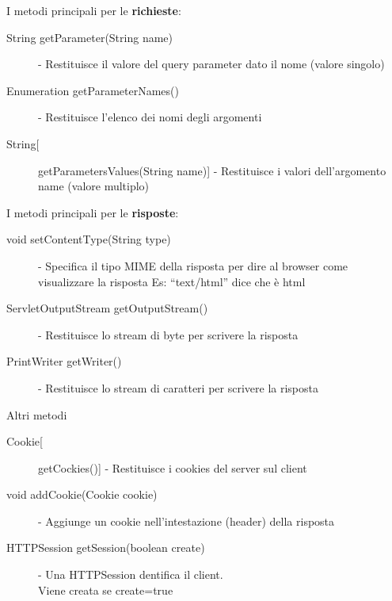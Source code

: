 I metodi principali per le \textbf{richieste}:
\begin{description}
    \item[String getParameter(String name)] - Restituisce il valore del query parameter dato il nome (valore singolo)
    \item[Enumeration getParameterNames()] - Restituisce l'elenco dei nomi degli argomenti
    \item[String[] getParametersValues(String name)] - Restituisce i valori dell'argomento name (valore multiplo)
\end{description}

I metodi principali per le \textbf{risposte}:
\begin{description}
    \item[void setContentType(String type)] - Specifica il tipo MIME della risposta per dire al browser come
    visualizzare la risposta Es: “text/html” dice che è html
    \item[ServletOutputStream getOutputStream()] - Restituisce lo stream di byte per scrivere la risposta
    \item[PrintWriter getWriter()] - Restituisce lo stream di caratteri per scrivere la risposta
\end{description}

Altri metodi
\begin{description}
    \item[Cookie[] getCockies()] - Restituisce i cookies del server sul client
    \item[void addCookie(Cookie cookie)] - Aggiunge un cookie nell'intestazione (header) della risposta
    \item[HTTPSession getSession(boolean create)] - Una HTTPSession dentifica il client.
    \\Viene creata se create=true
\end{description}
